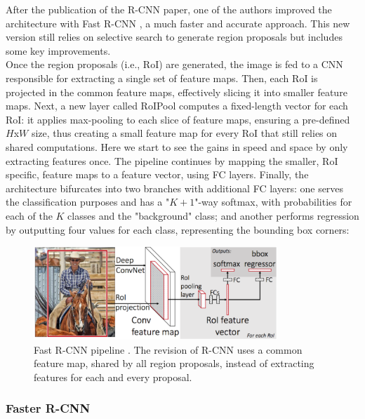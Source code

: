 After the publication of the \ac{R-CNN} paper, one of the authors improved the architecture with Fast \ac{R-CNN} \cite{fast_r_cnn}, a much faster and accurate approach. This new version still relies on selective search to generate region proposals but includes some key improvements.\\

Once the region proposals (i.e., \ac{RoI}) are generated, the image is fed to a \ac{CNN} responsible for extracting a single set of feature maps. Then, each \ac{RoI} is projected in the common feature maps,  effectively slicing it into smaller feature maps. Next, a new layer called \ac{RoIPool} computes a fixed-length vector for each \ac{RoI}: it applies max-pooling to each slice of feature maps, ensuring a pre-defined $H$x$W$ size, thus creating a small feature map for every \ac{RoI} that still relies on shared computations. Here we start to see the gains in speed and space by only extracting features once. The pipeline continues by mapping the smaller, \ac{RoI} specific, feature maps to a feature vector, using \ac{FC} layers. Finally, the architecture bifurcates into two branches with additional \ac{FC} layers: one serves the classification purposes and has a "$K + 1$"-way softmax, with probabilities for each of the $K$ classes and the "background" class; and another performs regression by outputting four values for each class, representing the bounding box corners:\\

\begin{figure}[h]
\centering
\includegraphics[width=260pt]{figures/figure_6.pdf}
\caption{Fast \ac{R-CNN} pipeline \cite{fast_r_cnn}. The revision of \ac{R-CNN} uses a common feature map, shared by all region proposals, instead of extracting features for each and every proposal.}
\label{fig:fast_r_cnn}
\end{figure}

\subsubsection{Faster \ac{R-CNN}}
\label{subsubsec:chap2_faster_rcnn}

